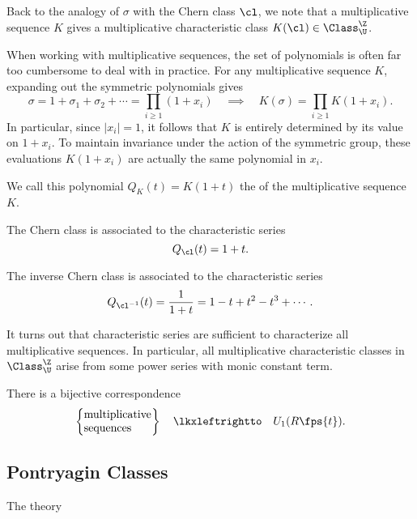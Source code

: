 	Back to the analogy of $\sigma$ with the Chern class $\cl$, we note that a multiplicative sequence $K$ gives a multiplicative characteristic class $K(\cl)\in \Class^\Z_\U$.
	
	When working with multiplicative sequences, the set of polynomials is often far too cumbersome to deal with in practice. For any multiplicative sequence $K$, 
	 expanding out the symmetric polynomials gives
	\[
			\sigma = 1+\sigma_1+\sigma_2+\cdots = \prod_{i\geq 1}(1+x_i)
			\quad\implies\quad
			K(\sigma) = \prod_{i\geq 1} K(1+x_i).
	\]
	In particular, since $|x_i|=1$, it follows that $K$ is entirely determined by its value on $1+x_i$. To maintain invariance under the action of the symmetric group, these evaluations $K(1+x_i)$ are actually the same polynomial in $x_i$. 

	\begin{definition} 
		We call this polynomial $Q_K(t)=K(1+t)$ the  of the multiplicative sequence $K$.
	\end{definition}


\begin{example}
	The Chern class is associated to the characteristic series 
	\[Q_\cl(t)=1+t.\]
\end{example}

\begin{example}
	The  inverse Chern class is associated to the characteristic series 
	\[Q_{\cl^{-1}}(t)=\frac{1}{1+t}=1-t+t^2-t^3+\cdots.\]
\end{example}

It turns out that characteristic series are sufficient to characterize all multiplicative sequences. In particular, all multiplicative characteristic classes in $\Class^\Z_\U$ arise from some power series with monic constant term.

\begin{theorem}
	There is a bijective correspondence 
	\[
		\left\{\parbox{6em}{multiplicative sequences}\right\}	\quad\lkxleftrightto\quad U_1(R\fps{t}).
	\]
\end{theorem}

\subsection{Pontryagin Classes}

The theory 

